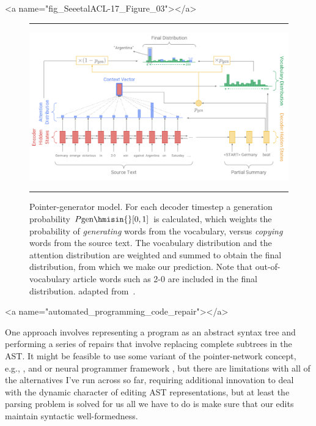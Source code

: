 \setcounter{figure}{1}


\rawhtml
<a name="fig_SeeetalACL-17_Figure_03"></a>
\endrawhtml
\begin{figure}
%
  \hrule{}
%
  \begin{center}
    \includegraphics[width=11.0in]{./figures/SeeetalACL-17_Figure_03.png}
  \end{center}
%
  \caption{Pointer-generator model. For each decoder timestep a generation probability $P\mbox{\rm{gen}} \hmisin{} [0, 1]$ is calculated, which weights the probability of {\it{generating}} words from the vocabulary, versus {\it{copying}} words from the source text. The vocabulary distribution and the attention distribution are weighted and summed to obtain the final distribution, from which we make our prediction. Note that out-of-vocabulary article words such as 2-0 are included in the final distribution. \emdash{} adapted from~\cite{SeeetalACL-17}.}
%
  \hrule{}
%
\end{figure}


\rawhtml
<a name="automated_programming_code_repair"></a>
\endrawhtml

One approach involves representing a program as an abstract syntax tree and performing a series of repairs that involve replacing complete subtrees in the AST. It might be feasible to use some variant of the pointer-network concept, e.g., {\cite{BhoopchandetalICLR-17}}, {\cite{SeeetalACL-17}} and  {\cite{WangandJiangICLR-17}} or neural programmer framework {\cite{NeelakantanetalICLR-17}}, but there are limitations with all of the alternatives I've run across so far, requiring additional innovation to deal with the dynamic character of editing AST representations, but at least the parsing problem is solved for us \emdash{} all we have to do is make sure that our edits maintain syntactic well-formedness.

